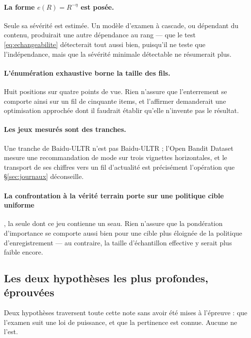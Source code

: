 \documentclass[11pt,a4paper]{article}
\begin{document}
\paragraph{La forme $e(R) = R^{-\eta}$ est posée.} Seule sa sévérité est estimée. Un modèle
d'examen à cascade, ou dépendant du contenu, produirait une autre dépendance au rang --- que
le test \eqref{eq:echangeabilite} détecterait tout aussi bien, puisqu'il ne teste que
l'indépendance, mais que la sévérité minimale détectable ne résumerait plus.

\paragraph{L'énumération exhaustive borne la taille des fils.} Huit positions sur quatre
points de vue. Rien n'assure que l'enterrement se comporte ainsi sur un fil de cinquante
items, et l'affirmer demanderait une optimisation approchée dont il faudrait établir qu'elle
n'invente pas le résultat.

\paragraph{Les jeux mesurés sont des tranches.} Une tranche de Baidu-ULTR n'est pas
Baidu-ULTR ; l'Open Bandit Dataset mesure une recommandation de mode sur trois vignettes
horizontales, et le transport de ses chiffres vers un fil d'actualité est précisément
l'opération que \S\ref{sec:journaux} déconseille.

\paragraph{La confrontation à la vérité terrain porte sur une politique cible uniforme}, la
seule dont ce jeu contienne un seau. Rien n'assure que la pondération d'importance se comporte
aussi bien pour une cible plus éloignée de la politique d'enregistrement --- au contraire, la
taille d'échantillon effective y serait plus faible encore.



\subsection{Les deux hypothèses les plus profondes, éprouvées}
\label{sec:anglesmorts}

Deux hypothèses traversent toute cette note sans avoir été mises à l'épreuve : que l'examen suit
une loi de puissance, et que la pertinence est connue. Aucune ne l'est.
\end{document}
